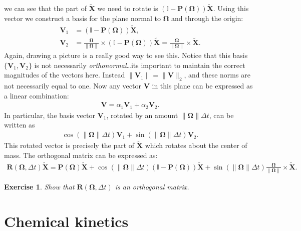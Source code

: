 \documentclass[10pt]{article}
\newtheorem{myexer}{Exercise}
\newcommand{\bs}[1]{{\boldsymbol #1}}
\begin{document}
we can see that the part of $\tilde{\bs X}$ we need to rotate is $(\mathbb{I} - {\bs P}({\bs \Omega})) \tilde{\bs X}.$  Using this vector we construct a basis for the plane normal to ${\bs \Omega}$ and through the origin:
\begin{align*}
{\bs V}_1 &=  (\mathbb{I} - {\bs P}({\bs \Omega})) \tilde{\bs X}, \\
{\bs V}_2 &=  \frac{{\bs \Omega}}{\|{\bs \Omega}\|} \times (\mathbb{I} - {\bs P}({\bs \Omega})) \tilde{\bs X} = \frac{{\bs \Omega}}{\|{\bs \Omega}\|} \times \tilde{\bs X}. 
\end{align*}
Again, drawing a picture is a really good way to see this.  Notice that this basis $\{{\bs V}_1, {\bs V}_2\}$ is not necessarily {\em orthonormal}\ldots its important to maintain the correct magnitudes of the vectors here.  Instead $\|{\bs V}_1\| = \|{\bs V}\|_2$, and these norms are not necessarily equal to one.  Now any vector ${\bs V}$ in this plane can be expressed as a linear combination:
\begin{align*}
{\bs V} = \alpha_1 {\bs V}_1 + \alpha_2 {\bs V}_2.
\end{align*}
In particular, the basis vector ${\bs V}_1$, rotated by an amount $\|{\bs \Omega}\|\Delta t$, can be written as 
\begin{align*}
 \cos(\|{\bs \Omega}\|\Delta t){\bs V}_1 + \sin(\|{\bs \Omega}\|\Delta t){\bs V}_2. 
\end{align*}
This rotated vector is precisely the part of $\tilde{\bs X}$ which  rotates about the center of mass.  The orthogonal matrix can be expressed as:
\begin{align*}
{\bs R}({\bs \Omega}, \Delta t) \tilde{\bs X} = {\bs P}({\bs \Omega}) \tilde{\bs X} +  \cos(\|{\bs \Omega}\|\Delta t) (\mathbb{I} - {\bs P}({\bs \Omega})) \tilde{\bs X} + \sin(\|{\bs \Omega}\|\Delta t) \frac{{\bs \Omega}}{\|{\bs \Omega}\|} \times \tilde{\bs X}.
\end{align*}
\begin{myexer}
Show that ${\bs R}({\bs \Omega}, \Delta t)$ is an orthogonal matrix.
\end{myexer}

\newpage
\section{Chemical kinetics}
\end{document}
